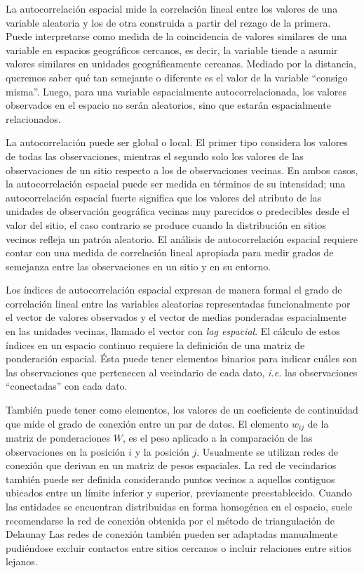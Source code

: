 \documentclass[11pt,b5paper,]{krantz}
\begin{document}
La autocorrelación espacial mide la correlación lineal entre los valores de una variable aleatoria y los de otra construida a partir del rezago de la primera. Puede interpretarse como medida de la coincidencia de valores similares de una variable en espacios geográficos cercanos, es decir, la variable tiende a asumir valores similares en unidades geográficamente cercanas. Mediado por la distancia, queremos saber qué tan semejante o diferente es el valor de la variable ``consigo misma''. Luego, para una variable espacialmente autocorrelacionada, los valores observados en el espacio no serán aleatorios, sino que estarán espacialmente relacionados.

La autocorrelación puede ser global o local. El primer tipo considera los valores de todas las observaciones, mientras el segundo solo los valores de las observaciones de un sitio respecto a los de observaciones vecinas. En ambos casos, la autocorrelación espacial puede ser medida en términos de su intensidad; una autocorrelación espacial fuerte significa que los valores del atributo de las unidades de observación geográfica vecinas muy parecidos o predecibles desde el valor del sitio, el caso contrario se produce cuando la distribución en sitios vecinos refleja un patrón aleatorio. El análisis de autocorrelación espacial requiere contar con una medida de correlación lineal apropiada para medir grados de semejanza entre las observaciones en un sitio y en su entorno.

Los índices de autocorrelación espacial expresan de manera formal el grado de correlación lineal entre las variables aleatorias representadas funcionalmente por el vector de valores observados y el vector de medias ponderadas espacialmente en las unidades vecinas, llamado el vector con \emph{lag espacial}. El cálculo de estos índices en un espacio continuo requiere la definición de una matriz de ponderación espacial. Ésta puede tener elementos binarios para indicar cuáles son las observaciones que pertenecen al vecindario de cada dato, \emph{i.e.} las observaciones ``conectadas'' con cada dato.

También puede tener como elementos, los valores de un coeficiente de continuidad que mide el grado de conexión entre un par de datos. El elemento \(w_{ij}\) de la matriz de ponderaciones \(W\), es el peso aplicado a la comparación de las observaciones en la posición \(i\) y la posición \(j\). Usualmente se utilizan redes de conexión que derivan en un matriz de pesos espaciales. La red de vecindarios también puede ser definida considerando puntos vecinos a aquellos contiguos ubicados entre un límite inferior y superior, previamente preestablecido. Cuando las entidades se encuentran distribuidas en forma homogénea en el espacio, suele recomendarse la red de conexión obtenida por el método de triangulación de Delaunay Las redes de conexión también pueden ser adaptadas manualmente pudiéndose excluir contactos entre sitios cercanos o incluir relaciones entre sitios lejanos.
\end{document}
